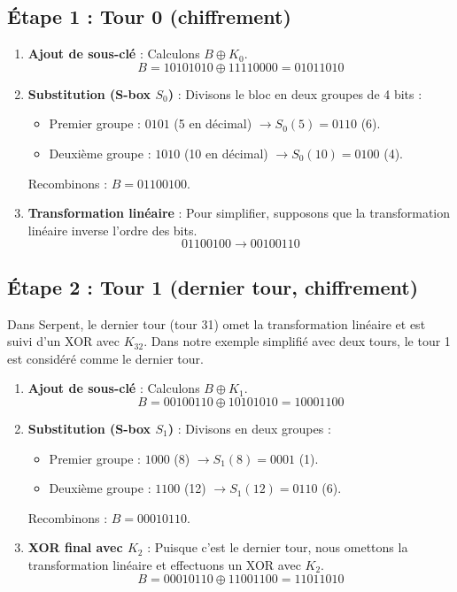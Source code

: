 \documentclass[12pt,a4paper]{report}
\begin{document}
\subsection{Étape 1 : Tour 0 (chiffrement)}
\begin{enumerate}
    \item \textbf{Ajout de sous-clé} : Calculons \( B \oplus K_0 \).
    \[
    B = 10101010 \oplus 11110000 = 01011010
    \]
    \item \textbf{Substitution (S-box \( S_0 \))} : Divisons le bloc en deux groupes de 4 bits :
    \begin{itemize}
        \item Premier groupe : \( 0101 \) (5 en décimal) \( \to S_0(5) = 0110 \) (6).
        \item Deuxième groupe : \( 1010 \) (10 en décimal) \( \to S_0(10) = 0100 \) (4).
    \end{itemize}
    Recombinons : \( B = 01100100 \).
    \item \textbf{Transformation linéaire} : Pour simplifier, supposons que la transformation linéaire inverse l'ordre des bits.
    \[
    01100100 \to 00100110
    \]
\end{enumerate}

\subsection{Étape 2 : Tour 1 (dernier tour, chiffrement)}
Dans Serpent, le dernier tour (tour 31) omet la transformation linéaire et est suivi d'un XOR avec \( K_{32} \). Dans notre exemple simplifié avec deux tours, le tour 1 est considéré comme le dernier tour.
\begin{enumerate}
    \item \textbf{Ajout de sous-clé} : Calculons \( B \oplus K_1 \).
    \[
    B = 00100110 \oplus 10101010 = 10001100
    \]
    \item \textbf{Substitution (S-box \( S_1 \))} : Divisons en deux groupes :
    \begin{itemize}
        \item Premier groupe : \( 1000 \) (8) \( \to S_1(8) = 0001 \) (1).
        \item Deuxième groupe : \( 1100 \) (12) \( \to S_1(12) = 0110 \) (6).
    \end{itemize}
    Recombinons : \( B = 00010110 \).
    \item \textbf{XOR final avec \( K_2 \)} : Puisque c'est le dernier tour, nous omettons la transformation linéaire et effectuons un XOR avec \( K_2 \).
    \[
    B = 00010110 \oplus 11001100 = 11011010
    \]
\end{enumerate}
\end{document}
